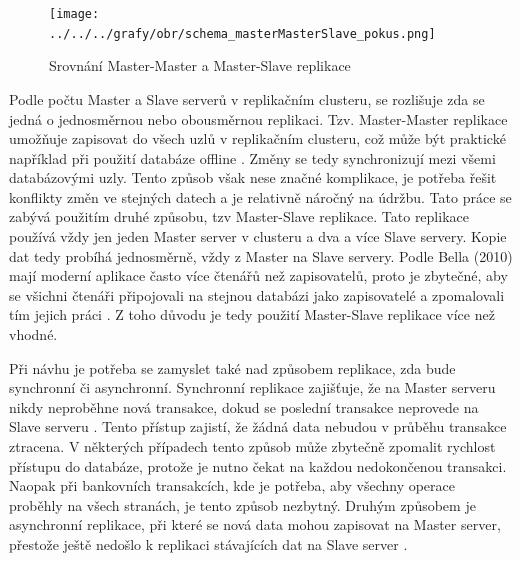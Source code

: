           \begin{figure}[H]
            \centering
            \texttt{[image: ../../../grafy/obr/schema\_masterMasterSlave\_pokus.png]}
            \caption {Srovnání Master-Master a Master-Slave replikace}
            \label{srovnaniM-M-S}
          \end{figure}

        Podle počtu Master a Slave serverů v replikačním clusteru, se rozlišuje zda se
        jedná o jednosměrnou nebo obousměrnou replikaci. Tzv. Master-Master replikace
        umožňuje zapisovat do všech uzlů v replikačním clusteru, což může být praktické
        například při použití databáze offline . Změny
        se tedy synchronizují mezi všemi databázovými uzly. Tento způsob však nese
        značné komplikace, je potřeba řešit konflikty změn ve stejných datech a je
        relativně náročný na údržbu. Tato práce se zabývá použitím druhé způsobu, tzv
        Master-Slave replikace. Tato replikace používá vždy jen jeden Master server v
        clusteru a dva a více Slave servery. Kopie dat tedy probíhá jednosměrně, vždy z
        Master na Slave servery. Podle Bella (2010) mají moderní aplikace často více
        čtenářů než zapisovatelů, proto je zbytečné, aby se všichni čtenáři připojovali
        na stejnou databázi jako zapisovatelé a zpomalovali tím jejich práci
        \citep{BellKindahlThalmann2010}. Z toho důvodu je tedy použití Master-Slave
        replikace více než vhodné.

        Při návhu je potřeba se zamyslet také nad způsobem replikace, zda bude
        synchronní či asynchronní. Synchronní replikace zajišťuje, že na Master
        serveru nikdy neproběhne nová transakce, dokud se poslední transakce
        neprovede na Slave serveru \citep{Boszormenyi2013}. Tento
        přístup zajistí, že žádná data nebudou v průběhu transakce ztracena. V
        některých případech tento způsob může zbytečně zpomalit rychlost
        přístupu do databáze, protože je nutno čekat na každou nedokončenou
        transakci. Naopak při bankovních transakcích, kde je potřeba, aby
        všechny operace proběhly na všech stranách, je tento způsob nezbytný.
        Druhým způsobem je asynchronní replikace, při které se nová data mohou
        zapisovat na Master server, přestože ještě nedošlo k replikaci
        stávajících dat na Slave server \citep{ObeHsu2012}. 
        
